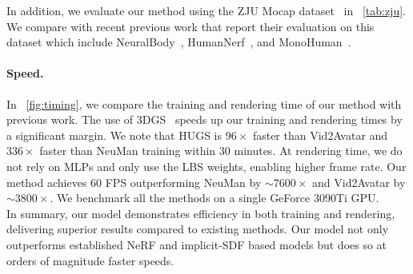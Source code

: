 In addition, we evaluate our method using the ZJU Mocap dataset~\cite{peng2021neuralbody} in ~\cref{tab:zju}. We compare with recent previous work that report their evaluation on this dataset which include NeuralBody~\cite{peng2021neuralbody}, HumanNerf~\cite{weng2022humannerf}, and MonoHuman~\cite{yu2023monohuman}. 





\label{sec:timing}



\paragraph{Speed.} In ~\cref{fig:timing}, we compare the training and rendering time of our method with previous work. The use of 3DGS~\cite{kerbl3Dgaussians} speeds up our training and rendering times by a significant margin. We note that HUGS is {$96 \times$} faster than Vid2Avatar and {$336 \times $} faster than NeuMan  training within 30 minutes.
At rendering time, we do not rely on MLPs and only use the LBS weights, enabling higher frame rate.
%
Our method achieves {60 FPS} outperforming NeuMan by {${\sim}7600 \times$} and Vid2Avatar by {${\sim}3800 \times$}. We benchmark all the methods on a single GeForce 3090Ti GPU. \\


In summary, our model demonstrates efficiency in both training and rendering, delivering superior results compared to existing methods. 
Our model not only outperforms established NeRF and implicit-SDF based models but does so at orders of magnitude faster speeds.


